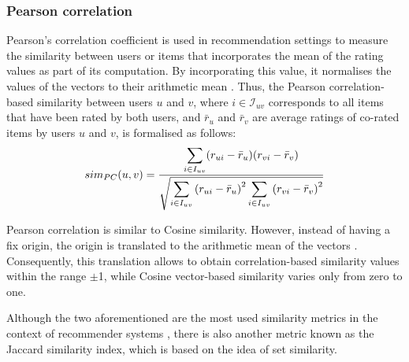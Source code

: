 \subsubsection*{Pearson correlation}\label{subsubsection:pearson_correlation}
Pearson's correlation coefficient is used in recommendation settings to measure the similarity between users or items that incorporates the mean of the rating values as part of its computation. By incorporating this value, it normalises the values of the vectors to their arithmetic mean \autocite{resnick94grouplens}.
Thus, the Pearson correlation-based similarity between users $u$ and $v$, where $i \in \mathcal{I}_{uv}$ corresponds to all items that have been rated by both users, and $\bar{r}_u$ and $\bar{r}_v$ are average ratings of co-rated items by users $u$ and $v$, is formalised as follows:
\begin{equation}
\label{eq:pearson_correlation_user_similarity}
sim_{PC}({u,v}) = 
\frac{
\displaystyle\sum_{i \in I_{uv}}(r_{ui} - \bar{r}_u)(r_{vi} - \bar{r}_v)
}{
\sqrt
{
\displaystyle\sum_{i \in I_{uv}}{(r_{ui} - \bar{r}_u)}^2 
\displaystyle\sum_{i \in I_{uv}}{(r_{vi} - \bar{r}_v)}^2
}
}
\vspace{1em}
\end{equation}



Pearson correlation is similar to Cosine similarity. However, instead of having a fix origin, the origin is translated to the arithmetic mean of the vectors \autocite{egghe09relation}. Consequently, this translation allows to obtain correlation-based similarity values within the range $\pm$1, while Cosine vector-based similarity varies only from zero to one.

Although the two aforementioned are the most used similarity metrics in the context of recommender systems \autocite{leskovec14mining, ricci15recommender}, there is also another metric known as the Jaccard similarity index, which is based on the idea of set similarity.



